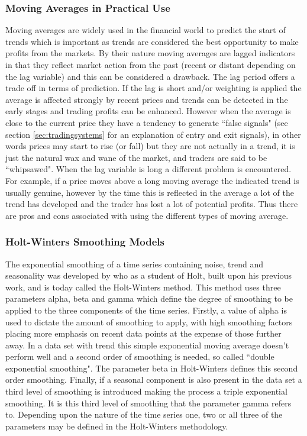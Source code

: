 \subsubsection{Moving Averages in Practical Use }
Moving averages are widely used in the financial world to predict the start of trends which is important as trends are considered the best opportunity to make profits from the markets. By their nature moving averages are lagged indicators in that they reflect market action from the past (recent or distant depending on the lag variable) and this can be considered a drawback. The lag period offers a trade off in terms of prediction. If the lag is short and/or weighting is applied the average is affected strongly by recent prices and trends can be detected in the early stages and trading profits can be enhanced. However when the average is close to the current price they have a tendency to generate \textquotedblleft false signals" (see section \ref{sec:tradingsystems} for an explanation of entry and exit signals), in other words prices may start to rise (or fall) but they are not actually in a trend, it is just the natural wax and wane of the market, and traders are said to be \textquotedblleft whipsawed". When the lag variable is long a different problem is encountered. For example, if a price moves above a long moving average the indicated trend is usually genuine, however by the time this is reflected in the average a lot of the trend has developed and the trader has lost a lot of potential profits. Thus there are pros and cons associated with using the different types of moving average.

\subsubsection{Holt-Winters Smoothing Models}
\label{sec:holtwinters}
The exponential smoothing of a time series containing noise, trend and seasonality was developed by \cite{Winters1960} who as a student of Holt, built upon his previous work, and is today called the Holt-Winters method. This method uses three parameters alpha, beta and gamma which define the degree of smoothing to be applied to the three components of the time series. Firstly, a value of alpha is used to dictate the amount of smoothing to apply, with high smoothing factors placing more emphasis on recent data points at the expense of those further away. In a data set with trend this simple exponential moving average doesn't perform well and a second order of smoothing is needed, so called \textquotedblleft double exponential smoothing". The parameter beta in Holt-Winters defines this second order smoothing. Finally, if a seasonal component is also present in the data set a third level of smoothing is introduced making the process a triple exponential smoothing. It is this third level of smoothing that the parameter gamma refers to. Depending upon the nature of the time series one, two or all three of the parameters may be defined in the Holt-Winters methodology.

